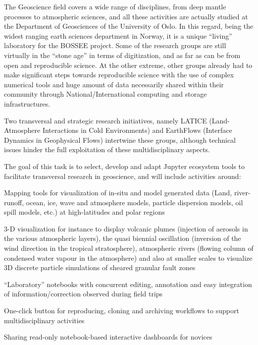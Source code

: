 \begin{task}[
  title=Geosciences application,
  id=geoscience,
  lead=UIO,
  PM=24,
  wphases={0-48},
  partners={UIO,QS,SRL}
]



The Geoscience field covers a wide range of disciplines, from deep
mantle processes to atmospheric sciences, and all these activities are
actually studied at the Department of Geosciences of the University of
Oslo. In this regard, being the widest ranging earth sciences
department in Norway, it is a unique “living” laboratory for the
BOSSEE project. Some of the research groups are still virtually in the
“stone age” in terms of digitization, and as far as can be from open
and reproducible science. At the other extreme, other groups already
had to make significant steps towards reproducible science with the
use of complex numerical tools and huge amount of data necessarily
shared within their community through National/International computing
and storage infrastructures.

Two transversal and strategic research initiatives, namely LATICE
(Land-Atmosphere Interactions in Cold Environments) and EarthFlows
(Interface Dynamics in Geophysical Flows) intertwine these groups,
although technical issues hinder the full exploitation of these
multidisciplinary aspects.

The goal of this task is to select, develop and adapt Jupyter
ecosystem tools to facilitate transversal research in geoscience, and
will include activities around:

  \begin{compactitem}
  \item Mapping tools for visualization of in-situ and model generated
    data (Land, river-runoff, ocean, ice, wave and atmosphere models,
    particle dispersion models, oil spill models, etc.)  at
    high-latitudes and polar regions

  \item 3-D visualization for instance to display volcanic plumes
    (injection of aerosols in the various atmospheric layers), the
    quasi biennial oscillation (inversion of the wind direction in the
    tropical stratosphere), atmospheric rivers (flowing column of
    condensed water vapour in the atmosphere) and also at smaller
    scales to visualize 3D discrete particle simulations of sheared
    granular fault zones
  \item “Laboratory” notebooks with concurrent editing, annotation and
    easy integration of information/correction observed during field
    trips
  \item One-click button for reproducing, cloning and archiving
    workflows to support multidisciplinary activities
   \item Sharing read-only notebook-based interactive dashboards for novices


\end{compactitem}
\end{task}
